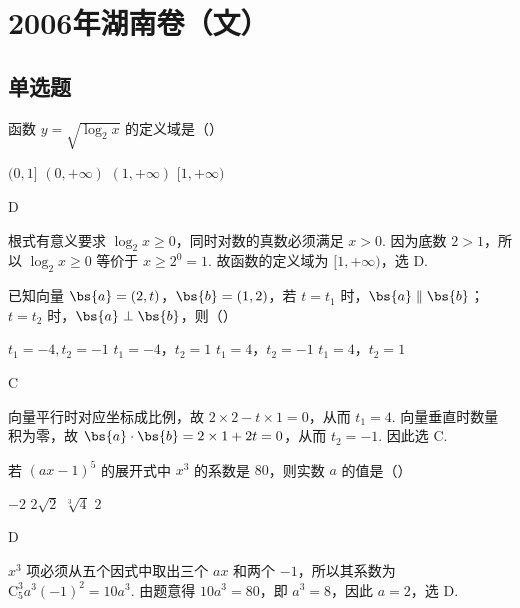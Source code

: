 \chapter{2006年湖南卷（文）}
\section{单选题}
\begin{problem}
函数 \(y=\sqrt{\log_{2}x}\) 的定义域是（\quad）

\choices
    {\((0,1]\)}
    {\((0,+\infty)\)}
    {\((1,+\infty)\)}
    {\([1,+\infty)\)}
\end{problem}

\begin{answer}
D
\end{answer}

\begin{solution}
根式有意义要求 \(\log_{2}x\geqslant0\)，同时对数的真数必须满足 \(x>0\). 因为底数 \(2>1\)，所以 \(\log_{2}x\geqslant0\) 等价于 \(x\geqslant2^0=1\). 故函数的定义域为 \([1,+\infty)\)，选 D.
\end{solution}

\begin{problem}
已知向量 \(\bs{a}=(2,t)\)，\(\bs{b}=(1,2)\)，若 \(t=t_1\) 时，\(\bs{a}\parallel\bs{b}\)；\(t=t_2\) 时，\(\bs{a}\perp\bs{b}\)，则（\quad）

\choices
    {\(t_1=-4,t_2=-1\)}
    {\(t_1=-4\)，\(t_2=1\)}
    {\(t_1=4\)，\(t_2=-1\)}
    {\(t_1=4\)，\(t_2=1\)}
\end{problem}

\begin{answer}
C
\end{answer}

\begin{solution}
向量平行时对应坐标成比例，故 \(2\times2-t\times1=0\)，从而 \(t_1=4\). 向量垂直时数量积为零，故 \(\bs{a}\cdot\bs{b}=2\times1+2t=0\)，从而 \(t_2=-1\). 因此选 C.
\end{solution}

\begin{problem}
若 \((ax-1)^5\) 的展开式中 \(x^3\) 的系数是 \(80\)，则实数 \(a\) 的值是（\quad）

\choices
    {\(-2\)}
    {\(2\sqrt{2}\)}
    {\(\sqrt[3]{4}\)}
    {\(2\)}
\end{problem}

\begin{answer}
D
\end{answer}

\begin{solution}
\(x^3\) 项必须从五个因式中取出三个 \(ax\) 和两个 \(-1\)，所以其系数为 \(\mathrm C_5^3a^3(-1)^2=10a^3\). 由题意得 \(10a^3=80\)，即 \(a^3=8\)，因此 \(a=2\)，选 D.
\end{solution}

